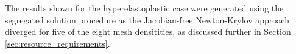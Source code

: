 \documentclass[sn-mathphys,Numbered]{sn-jnl}%
\begin{document}
The results shown for the hyperelastoplastic case were generated using the segregated solution procedure as the Jacobian-free Newton-Krylov approach diverged for five of the eight mesh densitities, as discussed further in Section \ref{sec:resource_requirements}.

\end{document}
